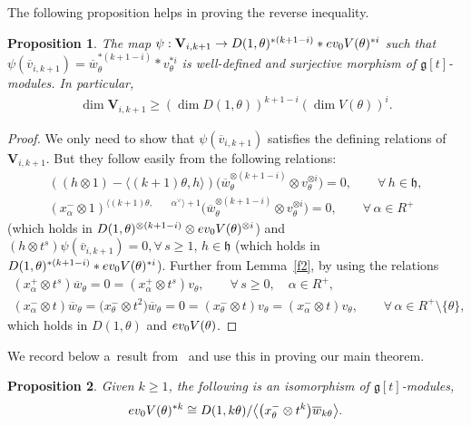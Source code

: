 \documentclass[11pt]{article}
\newtheorem{proposition}{Proposition}
\numberwithin{equation}{section}
\begin{document}
The following proposition helps in proving the reverse inequality.
\begin{proposition}
The map $\psi :\mathbf{V}_{i,k+1}\rightarrow D(1,\theta)^{* (k+1-i)} * \textup{ev}_0 V(\theta)^{*i}$ such that
$\psi(\overline{v}_{i,k+1}) = \overline{w}_{\theta}^{* (k+1-i)} * v_{\theta}^{*i}$ is well-defined and surjective
morphism of $\mathfrak{g}[t]$-modules.
In particular,
\begin{gather}
\label{dimg}
\dim \mathbf{V}_{i,k+1}\geq (\dim D(1, \theta))^{k+1-i} (\dim V(\theta))^{i}.
\end{gather}
\end{proposition}
\begin{proof}
We only need to show that $\psi(\overline{v}_{i,k+1})$ satisf\/ies the def\/ining relations of $\mathbf{V}_{i,k+1}$. But
they follow easily from the following relations:
\begin{gather*}
((h \otimes 1)-\langle (k+1)\theta, h\rangle)\big(\overline{w}_{\theta}^{\otimes (k+1-i)} \otimes v_{\theta}^{\otimes i}\big)=0,
\qquad
\forall\, h\in\mathfrak{h},
\\
(x^{-}_{\alpha}\otimes 1)^{\langle (k+1)\theta,
\qquad
\alpha^{\vee} \rangle + 1}\big(\overline{w}_{\theta}^{\otimes (k+1-i)}\otimes v_{\theta}^{\otimes i}\big)=0,
\qquad
\forall\, \alpha\in R^{+}
\end{gather*}
(which holds in $D(1,\theta)^{\otimes (k+1-i)} \otimes \textup{ev}_0 V(\theta)^{\otimes i}$) and $(h \otimes
t^s)\psi(\overline{v}_{i,k+1})=0, \forall\, s\geq 1$, $h\in\mathfrak{h}$
(which holds in $D(1,\theta)^{* (k+1-i)}*\textup{ev}_0 V(\theta)^{*i}$).
Further from Lemma~\ref{f2}, by using the relations
\begin{gather*}
(x^{+}_{\alpha}\otimes t^s)\overline{w}_{\theta}=0=(x^{+}_{\alpha}\otimes t^s)v_{\theta},
\qquad
\forall\, s\geq 0, \quad \alpha\in R^{+},
\\
(x^{-}_{\alpha}\otimes t)\overline{w}_{\theta}=\big(x^{-}_{\theta}\otimes
t^{2}\big)\overline{w}_{\theta}=0=(x^{-}_{\theta}\otimes t)v_{\theta}=(x^{-}_{\alpha}\otimes t)v_{\theta},
\qquad
\forall\, \alpha \in R^{+}\setminus\{\theta\},
\end{gather*}
which holds in $D(1,\theta)$ and $\textup{ev}_0 V(\theta)$.
\end{proof}

We record below a~result from~\cite{F} and use this in proving our main theorem.
\begin{proposition}\textup{\cite[Corollary 2]{F}}
\label{F}
Given $k\geq 1$, the following is an isomorphism of $\mathfrak{g}[t]$-modules,
\begin{gather*}
\textup{ev}_0 V(\theta)^{* k} \cong D(1, k\theta)/\big\langle \big({x^{-}_\theta} \otimes t^{k}\big) \overline{w}_{k\theta}\big\rangle.
\end{gather*}
\end{proposition}
\end{document}
